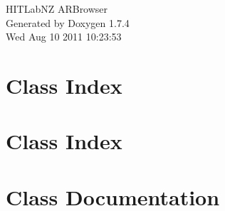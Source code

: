 \documentclass[a4paper]{book}
\begin{document}
\hypersetup{pageanchor=false}
\begin{titlepage}
\vspace*{7cm}
\begin{center}
{\Large HITLabNZ ARBrowser }\\
\vspace*{1cm}
{\large Generated by Doxygen 1.7.4}\\
\vspace*{0.5cm}
{\small Wed Aug 10 2011 10:23:53}\\
\end{center}
\end{titlepage}
\clearemptydoublepage
{}
\tableofcontents
\clearemptydoublepage
{}
\hypersetup{pageanchor=true}
\chapter{Class Index}

\chapter{Class Index}

\chapter{Class Documentation}















\printindex
\end{document}
